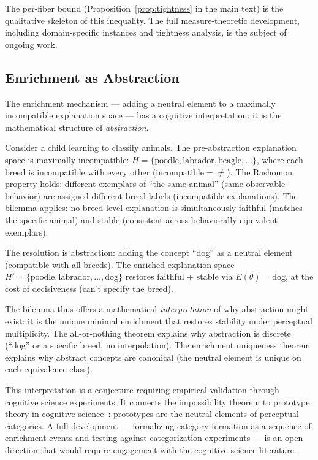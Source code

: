 \documentclass[11pt,a4paper]{article}
\begin{document}


The per-fiber bound (Proposition~\ref{prop:tightness} in the main text) is the qualitative skeleton of this inequality. The full measure-theoretic development, including domain-specific instances and tightness analysis, is the subject of ongoing work.

\subsection{Enrichment as Abstraction}
\label{sec:enrichment-abstraction}

The enrichment mechanism --- adding a neutral element to a maximally
incompatible explanation space --- has a cognitive interpretation: it is
the mathematical structure of \emph{abstraction}.

Consider a child learning to classify animals. The pre-abstraction
explanation space is maximally incompatible: $H = \{\text{poodle},
\text{labrador}, \text{beagle}, \ldots\}$, where each breed is
incompatible with every other ($\text{incompatible} = {\neq}$).  The
Rashomon property holds: different exemplars of ``the same animal''
(same observable behavior) are assigned different breed labels
(incompatible explanations).  The bilemma applies: no breed-level
explanation is simultaneously faithful (matches the specific animal) and
stable (consistent across behaviorally equivalent exemplars).

The resolution is abstraction: adding the concept ``dog'' as a neutral
element (compatible with all breeds).  The enriched explanation space
$H' = \{\text{poodle}, \text{labrador}, \ldots, \text{dog}\}$ restores
faithful + stable via $E(\theta) = \text{dog}$, at the cost of
decisiveness (can't specify the breed).

The bilemma thus offers a mathematical \emph{interpretation} of why
abstraction might exist: it is the unique minimal enrichment that
restores stability under perceptual multiplicity.  The all-or-nothing theorem
explains why abstraction is discrete (``dog'' or a specific breed, no
interpolation).  The enrichment uniqueness theorem explains why abstract
concepts are canonical (the neutral element is unique on each
equivalence class).

This interpretation is a conjecture requiring empirical validation through cognitive science experiments.  It connects the impossibility theorem to prototype
theory in cognitive science~\citep{rosch1975cognitive}: prototypes are
the neutral elements of perceptual categories.  A full development ---
formalizing category formation as a sequence of enrichment events and
testing against categorization experiments --- is an open direction that
would require engagement with the cognitive science literature.
\end{document}
